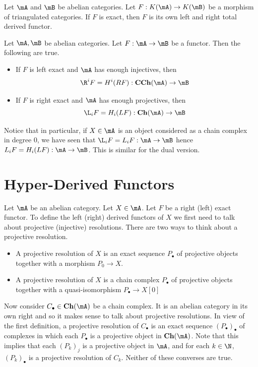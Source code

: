 \documentclass[a4paper]{article}
\begin{document}
\begin{lmm}{}{} Let $\mA$ and $\mB$ be abelian categories. Let $F:K(\mA)\to K(\mB)$ be a morphism of triangulated categories. If $F$ is exact, then $F$ is its own left and right total derived functor. 
\end{lmm}

\begin{thm}{}{} Let $\mA,\mB$ be abelian categories. Let $F:\mA\to\mB$ be a functor. Then the following are true. 
\begin{itemize}
\item If $F$ is left exact and $\mA$ has enough injectives, then $$\R^iF=H^i(RF):\bold{CCh}(\mA)\to\mB$$
\item If $F$ is right exact and $\mA$ has enough projectives, then $$\L_iF=H_i(LF):\bold{Ch}(\mA)\to\mB$$
\end{itemize}
\end{thm}

Notice that in particular, if $X\in\mA$ is an object considered as a chain complex in degree $0$, we have seen that $\L_iF=L_iF:\bold{\mA}\to\bold{\mB}$ hence $L_iF=H_i(LF):\bold{\mA}\to\bold{\mB}$. This is similar for the dual version. 

\pagebreak
\section{Hyper-Derived Functors}
Let $\mA$ be an abelian category. Let $X\in\mA$. Let $F$ be a right (left) exact functor. To define the left (right) derived functors of $X$ we first need to talk about projective (injective) resolutions. There are two ways to think about a projective resolution. 
\begin{itemize}
\item A projective resolution of $X$ is an exact sequence $P_\bullet$ of projective objects together with a morphism $P_0\to X$. 
\item A projective resolution of $X$ is a chain complex $P_\bullet$ of projective objects together with a quasi-isomorphism $P_\bullet\to X[0]$
\end{itemize}

Now consider $C_\bullet\in\bold{Ch}(\mA)$ be a chain complex. It is an abelian category in its own right and so it makes sense to talk about projective resolutions. In view of the first definition, a projective resolution of $C_\bullet$ is an exact sequence $(P_\bullet)_\bullet$ of complexes in which each $P_\bullet$ is a projective object in $\bold{Ch}(\mA)$. Note that this implies that each $(P_k)_j$ is a projective object in $\mA$, and for each $k\in\N$, $(P_k)_\bullet$ is a projective resolution of $C_k$. Neither of these converses are true. \\
\end{document}
